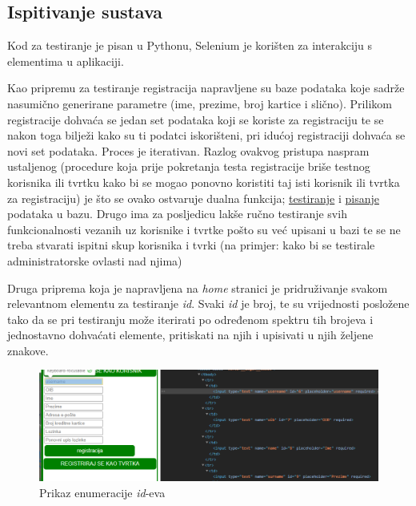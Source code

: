 			\subsection{Ispitivanje sustava}
							
					Kod za testiranje je pisan u Pythonu, Selenium je korišten za interakciju s elementima u aplikaciji.
			
			Kao pripremu za testiranje registracija napravljene su baze podataka koje sadrže nasumično generirane parametre (ime, prezime, broj kartice i slično). Prilikom registracije dohvaća se jedan set podataka koji se koriste za registraciju te se nakon toga bilježi kako su ti podatci iskorišteni, pri idućoj registraciji dohvaća se novi set podataka. Proces je iterativan. 
			Razlog ovakvog pristupa naspram ustaljenog (procedure koja prije pokretanja testa registracije briše testnog korisnika ili tvrtku kako bi se mogao ponovno koristiti taj isti korisnik ili tvrtka za registraciju) je što se ovako ostvaruje dualna funkcija; \underline{testiranje} i \underline{pisanje} podataka u bazu. Drugo ima za posljedicu lakše ručno testiranje svih funkcionalnosti vezanih uz korisnike i tvrtke pošto su već upisani u bazi te se ne treba stvarati ispitni skup korisnika i tvrki (na primjer: kako bi se testirale administratorske ovlasti nad njima)
			
			Druga priprema koja je napravljena na \textit{home} stranici je pridruživanje svakom relevantnom elementu za testiranje \textit{id}. Svaki \textit{id} je broj, te su vrijednosti posložene tako da se pri testiranju može iterirati po određenom spektru tih brojeva i jednostavno dohvaćati elemente, pritiskati na njih i upisivati u njih željene znakove. 
					
			
			\begin{figure}[H]
				\includegraphics[scale=0.6]{slike/html_id.png} %
				\centering
				\caption{Prikaz enumeracije \textit{id}-eva}
				\label{fig:promjene}
			\end{figure}
		
